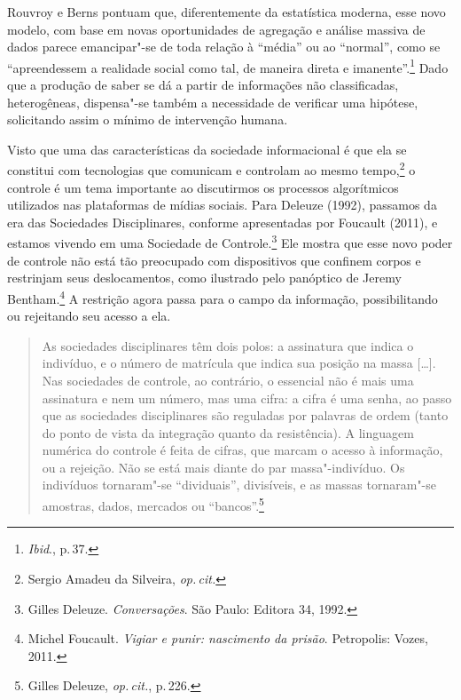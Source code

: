 Rouvroy e Berns pontuam que, diferentemente da estatística
moderna, esse novo modelo, com base em novas oportunidades de agregação
e análise massiva de dados parece emancipar"-se de toda relação à
``média'' ou ao ``normal'', como se ``apreendessem a realidade social
como tal, de maneira direta e imanente''.\footnote{\textit{Ibid}., p.\,37.} Dado que a produção
de saber se dá a partir de informações não classificadas, heterogêneas,
dispensa"-se também a necessidade de verificar uma hipótese, solicitando
assim o mínimo de intervenção humana.

Visto que uma das características da sociedade informacional é que ela
se constitui com tecnologias que comunicam e controlam ao mesmo tempo,\footnote{Sergio Amadeu da Silveira, \textit{op.\,cit.}}
o controle é um tema importante ao discutirmos os
processos algorítmicos utilizados nas plataformas de mídias sociais.
Para Deleuze (1992), passamos da era das Sociedades Disciplinares,
conforme apresentadas por Foucault (2011), e estamos vivendo em uma Sociedade de Controle.\footnote{Gilles Deleuze. \emph{Conversações}. São Paulo: Editora 34, 1992.} Ele mostra que esse novo poder de controle não está tão
preocupado com dispositivos que confinem corpos e restrinjam seus
deslocamentos, como ilustrado pelo panóptico de Jeremy Bentham.\footnote{Michel Foucault. \emph{Vigiar e punir: nascimento da prisão}. Petropolis: Vozes, 2011.}
A restrição agora passa para o campo da informação, possibilitando ou rejeitando seu acesso a ela.

\begin{quote}
As sociedades disciplinares têm dois polos: a assinatura que indica o
indivíduo, e o número de matrícula que indica sua posição na massa
{[}\ldots{}{]}. Nas sociedades de controle, ao contrário, o essencial não é mais
uma assinatura e nem um número, mas uma cifra: a cifra é uma senha, ao
passo que as sociedades disciplinares são reguladas por palavras de
ordem (tanto do ponto de vista da integração quanto da resistência). A
linguagem numérica do controle é feita de cifras, que marcam o acesso à
informação, ou a rejeição. Não se está mais diante do par
massa"-indivíduo. Os indivíduos tornaram"-se ``dividuais'', divisíveis, e
as massas tornaram"-se amostras, dados, mercados ou ``bancos''.\footnote{Gilles Deleuze, \textit{op.\,cit.}, p.\,226.}
\end{quote}

